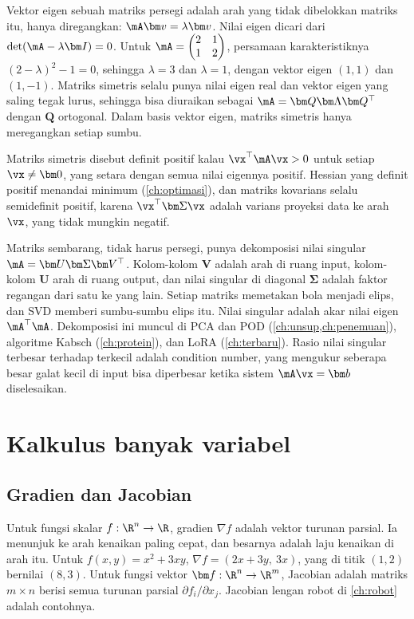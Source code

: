 Vektor eigen sebuah matriks persegi adalah arah yang tidak dibelokkan matriks itu, hanya diregangkan:
$\mA\bm v=\lambda\bm v$. Nilai eigen dicari dari $\det(\mA-\lambda\bm I)=0$. Untuk $\mA=\begin{pmatrix}2&1\\1&2\end{pmatrix}$,
persamaan karakteristiknya $(2-\lambda)^2-1=0$, sehingga $\lambda=3$ dan $\lambda=1$, dengan vektor eigen $(1,1)$ dan $(1,-1)$.
Matriks simetris selalu punya nilai eigen real dan vektor eigen yang saling tegak lurus, sehingga bisa diuraikan sebagai
$\mA=\bm Q\bm\Lambda\bm Q^\top$ dengan $\bm Q$ ortogonal. Dalam basis vektor eigen, matriks simetris hanya meregangkan setiap
sumbu.

Matriks simetris disebut definit positif kalau $\vx^\top\mA\vx>0$ untuk setiap $\vx\ne\bm0$, yang setara dengan semua nilai
eigennya positif. Hessian yang definit positif menandai minimum (\cref{ch:optimasi}), dan matriks kovarians selalu
semidefinit positif, karena $\vx^\top\bm\Sigma\vx$ adalah varians proyeksi data ke arah $\vx$, yang tidak mungkin negatif.

Matriks sembarang, tidak harus persegi, punya dekomposisi nilai singular $\mA=\bm U\bm\Sigma\bm V^\top$. Kolom-kolom $\bm V$ adalah
arah di ruang input, kolom-kolom $\bm U$ arah di ruang output, dan nilai singular di diagonal $\bm\Sigma$ adalah faktor regangan
dari satu ke yang lain. Setiap matriks memetakan bola menjadi elips, dan SVD memberi sumbu-sumbu elips itu. Nilai singular
adalah akar nilai eigen $\mA^\top\mA$. Dekomposisi ini muncul di PCA dan POD (\cref{ch:unsup,ch:penemuan}), algoritme Kabsch
(\cref{ch:protein}), dan LoRA (\cref{ch:terbaru}). Rasio nilai singular terbesar terhadap terkecil adalah condition number, yang
mengukur seberapa besar galat kecil di input bisa diperbesar ketika sistem $\mA\vx=\bm b$ diselesaikan.

\section{Kalkulus banyak variabel}

\subsection{Gradien dan Jacobian}

Untuk fungsi skalar $f:\R^n\to\R$, gradien $\nabla f$ adalah vektor turunan parsial. Ia menunjuk ke arah kenaikan paling cepat,
dan besarnya adalah laju kenaikan di arah itu. Untuk $f(x,y)=x^2+3xy$, $\nabla f=(2x+3y,\ 3x)$, yang di titik $(1,2)$ bernilai
$(8,3)$. Untuk fungsi vektor $\bm f:\R^n\to\R^m$, Jacobian adalah matriks $m\times n$ berisi semua turunan parsial
$\partial f_i/\partial x_j$. Jacobian lengan robot di \cref{ch:robot} adalah contohnya.

